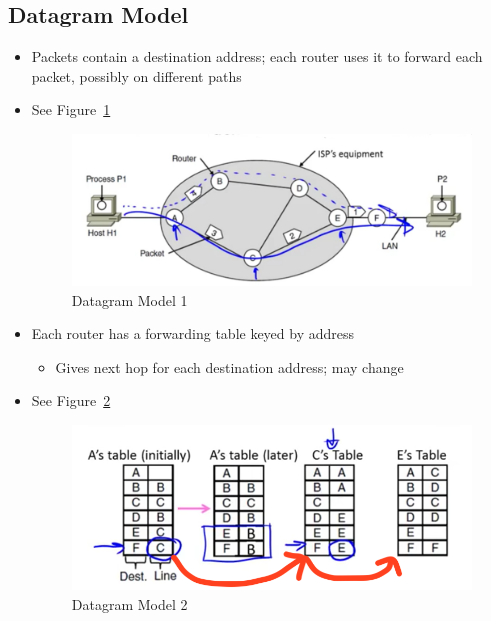 \documentclass[12pt]{ctexart}   %
\begin{document}
	\subsection{Datagram Model}
	\begin{itemize}
		\item Packets contain a destination address; each router uses it to forward each packet, possibly on different paths
		 \item See Figure~\ref{fig:4-2-3}
		
		\begin{figure}[h!] %
		\centering
		 \includegraphics[scale=0.7]{images/4-2-3}
		\caption{ Datagram Model 	1 }
		 \label{fig:4-2-3}
		 \end{figure}
		 
		 \item Each router has a forwarding table keyed by address
		 \begin{itemize}
		 	\item Gives next hop for each destination address; may change
		 \end{itemize}
		 \item See Figure~\ref{fig:4-2-4}
		
		\begin{figure}[h!] %
		\centering
		 \includegraphics[scale=0.7]{images/4-2-4}
		\caption{ Datagram Model 	2 }
		 \label{fig:4-2-4}
		 \end{figure}
	\end{itemize}
	
\end{document}

